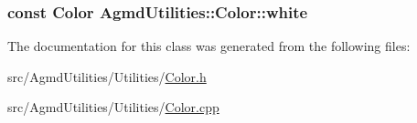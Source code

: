 \hypertarget{class_agmd_utilities_1_1_color_a0767e43641e0fedc97189dac0f92a0bc}{
\subsubsection[{white}]{\setlength{\rightskip}{0pt plus 5cm}const {\bf Color} Agmd\+Utilities\+::\+Color\+::white\hspace{0.3cm}{\ttfamily [static]}}}\label{class_agmd_utilities_1_1_color_a0767e43641e0fedc97189dac0f92a0bc}


The documentation for this class was generated from the following files\+:\begin{DoxyCompactItemize}
\item 
src/\+Agmd\+Utilities/\+Utilities/\hyperlink{_color_8h}{Color.\+h}\item 
src/\+Agmd\+Utilities/\+Utilities/\hyperlink{_color_8cpp}{Color.\+cpp}\end{DoxyCompactItemize}
